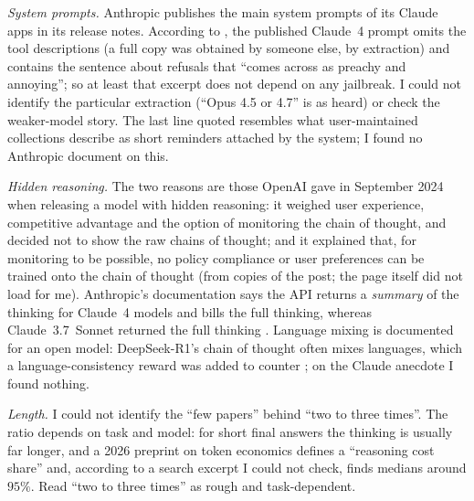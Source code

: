 \begin{beyond}\label{box:L6-hidden}
\emph{System prompts.} Anthropic publishes the main system prompts of its Claude apps in its release notes. According to \citet{willison2025}, the published Claude~4 prompt omits the tool descriptions (a full copy was obtained by someone else, by extraction) and contains the sentence about refusals that ``comes across as preachy and annoying''; so at least that excerpt does not depend on any jailbreak. I could not identify the particular extraction (``Opus 4.5 or 4.7'' is as heard) or check the weaker-model story. The last line quoted resembles what user-maintained collections describe as short reminders attached by the system; I found no Anthropic document on this.

\emph{Hidden reasoning.} The two reasons are those OpenAI gave in September 2024 when releasing a model with hidden reasoning: it weighed user experience, competitive advantage and the option of monitoring the chain of thought, and decided not to show the raw chains of thought; and it explained that, for monitoring to be possible, no policy compliance or user preferences can be trained onto the chain of thought \citep{openai2024o1} (from copies of the post; the page itself did not load for me). Anthropic's documentation says the API returns a \emph{summary} of the thinking for Claude~4 models and bills the full thinking, whereas Claude~3.7~Sonnet returned the full thinking \citep{anthropicdocs2026}. Language mixing is documented for an open model: DeepSeek-R1's chain of thought often mixes languages, which a language-consistency reward was added to counter \citep{deepseek2025r1}; on the Claude anecdote I found nothing.

\emph{Length.} I could not identify the ``few papers'' behind ``two to three times''. The ratio depends on task and model: for short final answers the thinking is usually far longer, and a 2026 preprint on token economics \citep{wani2026} defines a ``reasoning cost share'' and, according to a search excerpt I could not check, finds medians around $95\%$. Read ``two to three times'' as rough and task-dependent.
\end{beyond}


